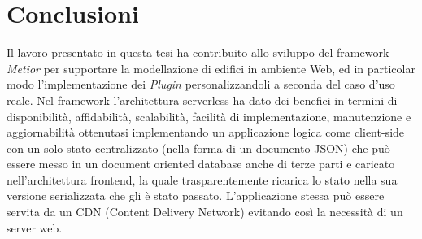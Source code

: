 \section{Conclusioni}
\label{sec:conclusions_section_1}

Il lavoro presentato in questa tesi ha contribuito allo sviluppo del framework \emph{Metior}
per supportare la modellazione di edifici in ambiente Web, ed in particolar modo l'implementazione dei \emph{Plugin}
personalizzandoli a seconda del caso d'uso reale.
Nel framework l'architettura serverless ha dato dei benefici
in termini di disponibilità, affidabilità,  scalabilità, facilità di implementazione, manutenzione e aggiornabilità
ottenutasi implementando un applicazione logica come client-side con un solo stato centralizzato
(nella forma di un documento JSON) che può essere messo in un
document oriented database anche di terze parti e caricato nell'architettura frontend, la quale
trasparentemente ricarica lo stato nella sua versione serializzata che gli è stato passato.
L'applicazione stessa può essere servita da un CDN (Content Delivery Network) evitando così la necessità di un server web.
